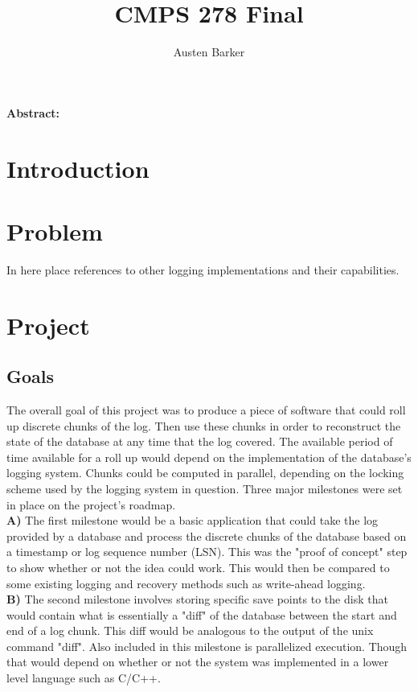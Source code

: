 \documentclass{article}
\begin{document}
\title{CMPS 278 Final}
\author{Austen Barker}
\maketitle


\textbf{Abstract:} 
\section{Introduction}
\section{Problem}
In here place references to other logging implementations and their capabilities.
\section{Project}
\subsection{Goals}
The overall goal of this project was to produce a piece of software that could roll up discrete chunks
of the log. Then use these chunks in order to reconstruct the state of the database at any time that
the log covered. The available period of time available for a roll up would depend on the implementation
of the database's logging system. Chunks could be computed in parallel, depending on the locking scheme
used by the logging system in question. Three major milestones were set in place on the project's roadmap.\\

\textbf{A)} The first milestone would be a basic application that could take the log provided by a database
and process the discrete chunks of the database based on a timestamp or log sequence number (LSN). This was 
the "proof of concept" step to show whether or not the idea could work. This would then be compared to some
existing logging and recovery methods such as write-ahead logging.\\

\textbf{B)} The second milestone involves storing specific save points to the disk that would contain what 
is essentially a "diff" of the database between the start and end of a log chunk. This diff would be 
analogous to the output of the unix command "diff". Also included in this milestone is parallelized execution.
Though that would depend on whether or not the system was implemented in a lower level language such as C/C++.\\
\end{document}
